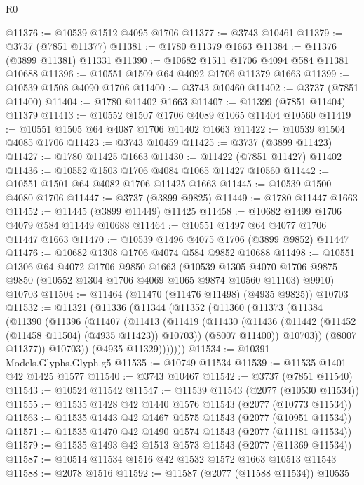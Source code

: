 \begin{lexlean}{R0}
\begin{coremodule}
@11376 := @10539 @1512 @4095 @1706
@11377 := @3743 @10461
@11379 := @3737 (@7851 @11377)
@11381 := @1780 @11379 @1663
@11384 := @11376 (@3899 @11381) @11331
@11390 := @10682 @1511 @1706 @4094 @584 @11381 @10688
@11396 := @10551 @1509 @64 @4092 @1706 @11379 @1663
@11399 := @10539 @1508 @4090 @1706
@11400 := @3743 @10460
@11402 := @3737 (@7851 @11400)
@11404 := @1780 @11402 @1663
@11407 := @11399 (@7851 @11404) @11379
@11413 := @10552 @1507 @1706 @4089 @1065 @11404 @10560
@11419 := @10551 @1505 @64 @4087 @1706 @11402 @1663
@11422 := @10539 @1504 @4085 @1706
@11423 := @3743 @10459
@11425 := @3737 (@3899 @11423)
@11427 := @1780 @11425 @1663
@11430 := @11422 (@7851 @11427) @11402
@11436 := @10552 @1503 @1706 @4084 @1065 @11427 @10560
@11442 := @10551 @1501 @64 @4082 @1706 @11425 @1663
@11445 := @10539 @1500 @4080 @1706
@11447 := @3737 (@3899 @9825)
@11449 := @1780 @11447 @1663
@11452 := @11445 (@3899 @11449) @11425
@11458 := @10682 @1499 @1706 @4079 @584 @11449 @10688
@11464 := @10551 @1497 @64 @4077 @1706 @11447 @1663
@11470 := @10539 @1496 @4075 @1706 (@3899 @9852) @11447
@11476 := @10682 @1308 @1706 @4074 @584 @9852 @10688
@11498 := @10551
    @1306
    @64
    @4072
    @1706
    @9850
    @1663
    (@10539
      @1305
      @4070
      @1706
      @9875
      @9850
      (@10552 @1304 @1706 @4069 @1065 @9874 @10560 @11103)
      @9910)
    @10703
@11504 := @11464 (@11470 (@11476 @11498) (@4935 @9825)) @10703
@11532 := @11321
    (@11336
      (@11344
        (@11352
          (@11360
            (@11373
              (@11384
                (@11390
                  (@11396
                    (@11407
                      (@11413
                        (@11419
                          (@11430
                            (@11436 (@11442 (@11452 (@11458 @11504) (@4935 @11423)) @10703))
                            (@8007 @11400))
                          @10703))
                      (@8007 @11377))
                    @10703))
                (@4935 @11329)))))))
@11534 := @10391 Models.Glyphs.Glyph.g5
@11535 := @10749 @11534
@11539 := @11535 @1401 @42 @1425 @1577
@11540 := @3743 @10467
@11542 := @3737 (@7851 @11540)
@11543 := @10524 @11542
@11547 := @11539 @11543 (@2077 (@10530 @11534))
@11555 := @11535 @1428 @42 @1440 @1576 @11543 (@2077 (@10773 @11534))
@11563 := @11535 @1443 @42 @1467 @1575 @11543 (@2077 (@10951 @11534))
@11571 := @11535 @1470 @42 @1490 @1574 @11543 (@2077 (@11181 @11534))
@11579 := @11535 @1493 @42 @1513 @1573 @11543 (@2077 (@11369 @11534))
@11587 := @10514 @11534 @1516 @42 @1532 @1572 @1663 @10513 @11543
@11588 := @2078 @1516
@11592 := @11587 (@2077 (@11588 @11534)) @10535

\end{coremodule}
\end{lexlean}
